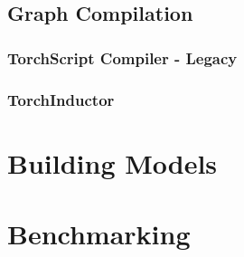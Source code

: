   \subsection*{Graph Compilation}
    \subsubsection{TorchScript Compiler - Legacy}\label{subsubsec:torchinductor}
    \subsubsection{TorchInductor}\label{subsubsec:torchinductor}
\section*{Building Models}\label{sec:building_models}
    \subsection{}\label{subsec:torchinductor}
      

\section{Benchmarking}\label{sec:benchmarking}



